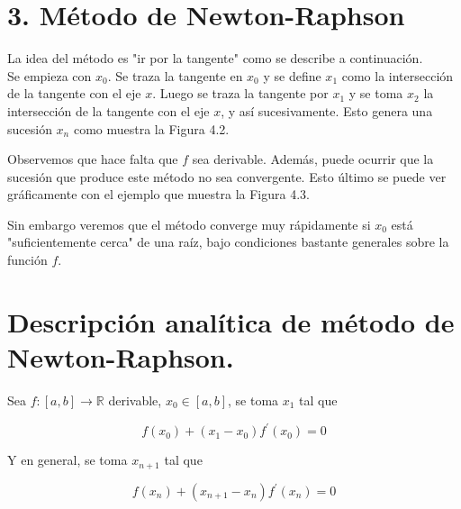 \documentclass[10pt]{article}
\begin{document}
\section*{3. Método de Newton-Raphson}
La idea del método es "ir por la tangente" como se describe a continuación.\\
Se empieza con $x_{0}$. Se traza la tangente en $x_{0}$ y se define $x_{1}$ como la intersección de la tangente con el eje $x$. Luego se traza la tangente por $x_{1}$ y se toma $x_{2}$ la intersección de la tangente con el eje $x$, y así sucesivamente. Esto genera una sucesión $x_{n}$ como muestra la Figura 4.2.

Observemos que hace falta que $f$ sea derivable. Además, puede ocurrir que la sucesión que produce este método no sea convergente. Esto último se puede ver gráficamente con el ejemplo que muestra la Figura 4.3.

Sin embargo veremos que el método converge muy rápidamente si $x_{0}$ está "suficientemente cerca" de una raíz, bajo condiciones bastante generales sobre la función $f$.

\section*{Descripción analítica de método de Newton-Raphson.}
Sea $f:[a, b] \rightarrow \mathbb{R}$ derivable, $x_{0} \in[a, b]$, se toma $x_{1}$ tal que

$$
f\left(x_{0}\right)+\left(x_{1}-x_{0}\right) f^{\prime}\left(x_{0}\right)=0
$$

Y en general, se toma $x_{n+1}$ tal que

$$
f\left(x_{n}\right)+\left(x_{n+1}-x_{n}\right) f^{\prime}\left(x_{n}\right)=0
$$
\end{document}
